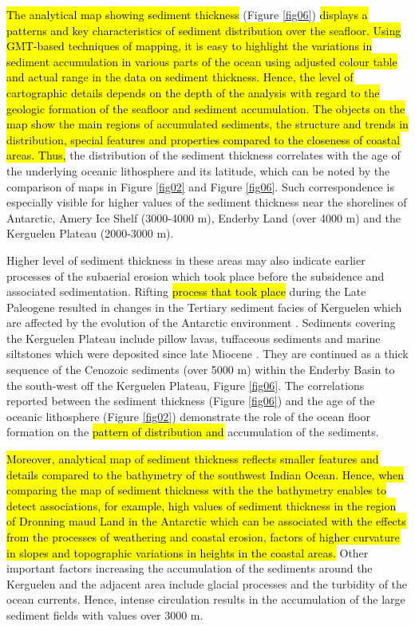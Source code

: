 \documentclass[geomatics,article,submit,pdftex,moreauthors]{Definitions/mdpi}
\begin{document}
\hl{The analytical map showing sediment thickness} (Figure \ref{fig06}) \hl{displays a patterns and key characteristics of sediment distribution over the seafloor. Using GMT-based techniques of mapping, it is easy to highlight the variations in sediment accumulation in various parts of the ocean using adjusted colour table and actual range in the data on sediment thickness. Hence, the level of cartographic details depends on the depth of the analysis with regard to the geologic formation of the seafloor and sediment accumulation. The objects on the map show the main regions of accumulated sediments, the structure and trends in distribution, special features and properties compared to the closeness of coastal areas. Thus, }the distribution of the sediment thickness correlates with the age of the underlying oceanic lithosphere and its latitude, which can be noted by the comparison of maps in Figure \ref{fig02} and Figure \ref{fig06}. Such correspondence is especially visible for higher values of the sediment thickness near the shorelines of Antarctic, Amery Ice Shelf (3000-4000 m), Enderby Land (over 4000 m) and the Kerguelen Plateau (2000-3000 m). 

Higher level of sediment thickness in these areas may also indicate earlier processes of the subaerial erosion which took place before the subsidence and associated sedimentation. Rifting \hl{process that took place }during the Late Paleogene resulted in changes in the Tertiary sediment facies of Kerguelen which are affected by the evolution of the Antarctic environment \cite{Froehlich}. Sediments covering the Kerguelen Plateau include pillow lavas, tuffaceous sediments and marine siltstones which were deposited since late Miocene \cite{Duncan}. They are continued as a thick sequence of the Cenozoic sediments (over 5000 m) within the Enderby Basin to the south-west off the Kerguelen Plateau, Figure \ref{fig06}. The correlations reported between the sediment thickness (Figure \ref{fig06}) and the age of the oceanic lithosphere (Figure \ref{fig02}) demonstrate the role of the ocean floor formation on the \hl{pattern of distribution and }accumulation of the sediments. 

\hl{Moreover, analytical map of sediment thickness reflects smaller features and details compared to the bathymetry of the southwest Indian Ocean. Hence, when comparing the map of sediment thickness with the the bathymetry enables to detect associations, for example, high values of sediment thickness in the region of  Dronning maud Land in the Antarctic which can be associated with the effects from the processes of weathering and coastal erosion, factors of higher curvature in slopes and topographic variations in heights in the coastal areas. }Other important factors increasing the accumulation of the sediments around the Kerguelen and the adjacent area include glacial processes and the turbidity of the ocean currents. Hence, intense circulation results in the accumulation of the large sediment fields with values over 3000 m. 
\end{document}
